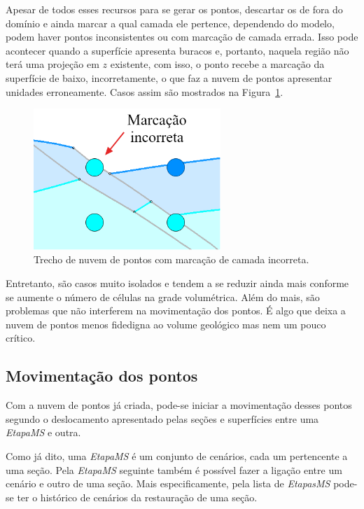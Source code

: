 Apesar de todos esses recursos para se gerar os pontos, descartar os de fora do domínio e ainda marcar a qual camada ele pertence, dependendo do modelo, podem haver pontos inconsistentes ou com marcação de camada errada. Isso pode acontecer quando a superfície apresenta buracos e, portanto, naquela região não terá uma projeção em $z$ existente, com isso, o ponto recebe a marcação da superfície de baixo, incorretamente, o que faz a nuvem de pontos apresentar unidades erroneamente. Casos assim são mostrados na Figura~\ref{fig-vol-errors}.

\begin{figure} [H]
  \begin{center}
    \includegraphics[width=200pt]{images/fig-vol-errors}
    \caption{Trecho de nuvem de pontos com marcação de camada incorreta.}\label{fig-vol-errors}
  \end{center}
\end{figure}

Entretanto, são casos muito isolados e tendem a se reduzir ainda mais conforme se aumente o número de células na grade volumétrica. Além do mais, são problemas que não interferem na movimentação dos pontos. É algo que deixa a nuvem de pontos menos fidedigna ao volume geológico mas nem um pouco crítico.

\subsection{Movimentação dos pontos}

Com a nuvem de pontos já criada, pode-se iniciar a movimentação desses pontos segundo o deslocamento apresentado pelas seções e superfícies entre uma \emph{EtapaMS} e outra. 

Como já dito, uma \emph{EtapaMS} é um conjunto de cenários, cada um pertencente a uma seção. Pela \emph{EtapaMS} seguinte também é possível fazer a ligação entre um cenário e outro de uma seção. Mais especificamente, pela lista de \emph{EtapasMS} pode-se ter o histórico de cenários da restauração de uma seção.

